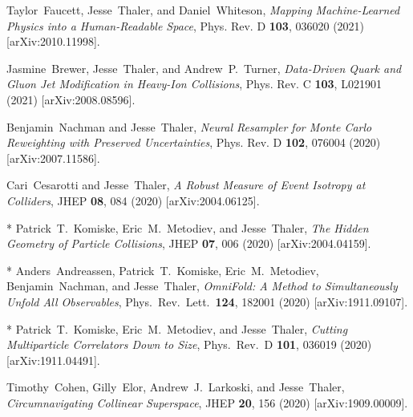 \documentclass[11pt]{article}
\renewcommand{\bibitem}[1]{\item}
\begin{document}
\begin{list}{[]\addtocounter{jessecount}{-1}}{\leftmargin=3em \itemsep=4pt}
\bibitem{Faucett:2020vbu}
Taylor~Faucett, Jesse~Thaler, and Daniel~Whiteson,
\emph{Mapping Machine-Learned Physics into a Human-Readable Space},
Phys. Rev. D \textbf{103}, 036020 (2021)
[arXiv:2010.11998].

\bibitem{Brewer:2020och}
Jasmine~Brewer, Jesse~Thaler, and Andrew~P.~Turner,
\emph{Data-Driven Quark and Gluon Jet Modification in Heavy-Ion Collisions},
Phys. Rev. C \textbf{103}, L021901 (2021)
[arXiv:2008.08596].

\bibitem{Nachman:2020fff}
Benjamin~Nachman and Jesse~Thaler,
\emph{Neural Resampler for Monte Carlo Reweighting with Preserved Uncertainties},
Phys. Rev. D \textbf{102}, 076004 (2020)
[arXiv:2007.11586].


\bibitem{Cesarotti:2020hwb}
Cari~Cesarotti and Jesse~Thaler,
\emph{A Robust Measure of Event Isotropy at Colliders},
JHEP \textbf{08}, 084 (2020)
[arXiv:2004.06125].

\bibitem{Komiske:2020qhg}
  * Patrick~T.~Komiske, Eric~M.~Metodiev, and Jesse~Thaler,
\emph{The Hidden Geometry of Particle Collisions},
JHEP \textbf{07}, 006 (2020)
[arXiv:2004.04159].

\bibitem{Andreassen:2019cjw}
* Anders~Andreassen, Patrick~T.~Komiske, Eric~M.~Metodiev, Benjamin~Nachman, and Jesse~Thaler,
\emph{OmniFold: A Method to Simultaneously Unfold All Observables},
  Phys.\ Rev.\ Lett.\  {\bf 124}, 182001 (2020)
[arXiv:1911.09107].

\bibitem{Komiske:2019asc}
  * Patrick~T.~Komiske, Eric~M.~Metodiev, and Jesse~Thaler,
\emph{Cutting Multiparticle Correlators Down to Size},
Phys.\ Rev.\ D \textbf{101}, 036019 (2020)
[arXiv:1911.04491].

\bibitem{Cohen:2019gsc}
Timothy~Cohen, Gilly~Elor, Andrew~J.~Larkoski, and Jesse~Thaler,
\emph{Circumnavigating Collinear Superspace},
JHEP \textbf{20}, 156 (2020)
[arXiv:1909.00009].


\end{list}
\end{document}
